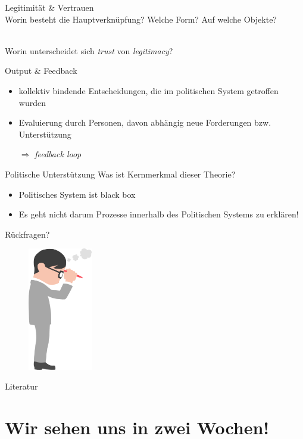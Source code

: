 \documentclass[11pt]{beamer}
\begin{document}
\begin{frame}[t]{Legitimität \& Vertrauen}
 \\ 
Worin besteht die Hauptverknüpfung? Welche Form? Auf welche Objekte? \\ \pause

 \\
Worin unterscheidet sich \textit{trust} von \textit{legitimacy}? \\
\end{frame}

\begin{frame}[t]{Output \& Feedback}
 \\  \pause
\begin{itemize}
	\item kollektiv bindende Entscheidungen, die im politischen System getroffen wurden \pause
	\item Evaluierung durch Personen, davon abhängig neue Forderungen bzw. Unterstützung \pause
	\item[$\Rightarrow$] \textit{feedback loop}
\end{itemize}

\end{frame}

\begin{frame}[t]{Politische Unterstützung}
Was ist Kernmerkmal dieser Theorie? \\ \pause

	\begin{itemize}
		\item Politisches System ist black box \pause
		\item Es geht nicht darum Prozesse innerhalb des Politischen Systems zu erklären!
	\end{itemize}

\end{frame}

\begin{frame}{Rückfragen?}
	\begin{figure}[ht]
		\includegraphics[width=0.25\textwidth]{pics/s2-9.png}
	\end{figure}

\end{frame}

\renewcommand*{\bibfont}{\scriptsize}

\begin{frame}[allowframebreaks]{Literatur}
	\nocite{*}
	\printbibliography[heading = none]
\end{frame}

\section{Wir sehen uns in zwei Wochen!}
\end{document}
